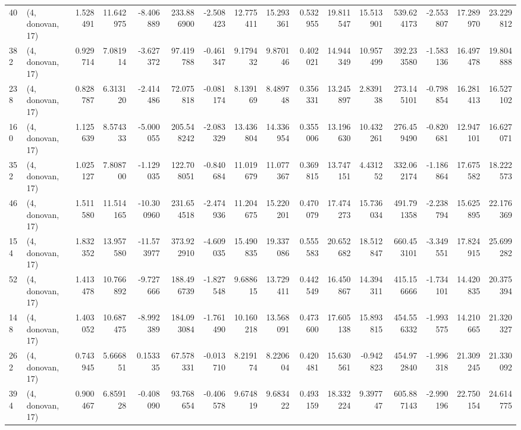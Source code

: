 \begin{tabular}{llrrrrrrrrrrrrrr}
40  &  (4, donovan, 17) &   1.528491 &  11.642975 &  -8.406889 &   233.886900 &  -2.508423 &  12.775411 &  15.293361 &  0.532955 &  19.811547 &  15.513901 &   539.624173 &  -2.553807 &  17.289970 &  23.229812 \\
382 &  (4, donovan, 17) &   0.929714 &   7.081914 &  -3.627372 &    97.419788 &  -0.461347 &   9.179432 &   9.870146 &  0.402021 &  14.944349 &  10.957499 &   392.233580 &  -1.583136 &  16.497478 &  19.804888 \\
238 &  (4, donovan, 17) &   0.828787 &   6.313120 &  -2.414486 &    72.075818 &  -0.081174 &   8.139169 &   8.489748 &  0.356331 &  13.245897 &   2.839138 &   273.145101 &  -0.798854 &  16.281413 &  16.527102 \\
160 &  (4, donovan, 17) &   1.125639 &   8.574333 &  -5.000055 &   205.548242 &  -2.083329 &  13.436804 &  14.336954 &  0.355006 &  13.196630 &  10.432261 &   276.459490 &  -0.820681 &  12.947101 &  16.627071 \\
352 &  (4, donovan, 17) &   1.025127 &   7.808700 &  -1.129035 &   122.708051 &  -0.840684 &  11.019679 &  11.077367 &  0.369815 &  13.747151 &   4.431252 &   332.062174 &  -1.186864 &  17.675582 &  18.222573 \\
46  &  (4, donovan, 17) &   1.511580 &  11.514165 & -10.300960 &   231.654518 &  -2.474936 &  11.204675 &  15.220201 &  0.470079 &  17.474273 &  15.736034 &   491.791358 &  -2.238794 &  15.625895 &  22.176369 \\
154 &  (4, donovan, 17) &   1.832352 &  13.957580 & -11.573977 &   373.922910 &  -4.609035 &  15.490835 &  19.337086 &  0.555583 &  20.652682 &  18.512847 &   660.453101 &  -3.349551 &  17.824915 &  25.699282 \\
52  &  (4, donovan, 17) &   1.413478 &  10.766892 &  -9.727666 &   188.496739 &  -1.827548 &   9.688615 &  13.729411 &  0.442549 &  16.450867 &  14.394311 &   415.156666 &  -1.734101 &  14.420835 &  20.375394 \\
148 &  (4, donovan, 17) &   1.403052 &  10.687475 &  -8.992389 &   184.093084 &  -1.761490 &  10.160218 &  13.568091 &  0.473600 &  17.605138 &  15.893815 &   454.556332 &  -1.993575 &  14.210665 &  21.320327 \\
262 &  (4, donovan, 17) &   0.743945 &   5.666851 &   0.153335 &    67.578331 &  -0.013710 &   8.219174 &   8.220604 &  0.420481 &  15.630561 &  -0.942823 &   454.972840 &  -1.996318 &  21.309245 &  21.330092 \\
394 &  (4, donovan, 17) &   0.900467 &   6.859128 &  -0.408090 &    93.768654 &  -0.406578 &   9.674819 &   9.683422 &  0.493159 &  18.332224 &   9.397747 &   605.887143 &  -2.990196 &  22.750154 &  24.614775 \\

\end{tabular}
